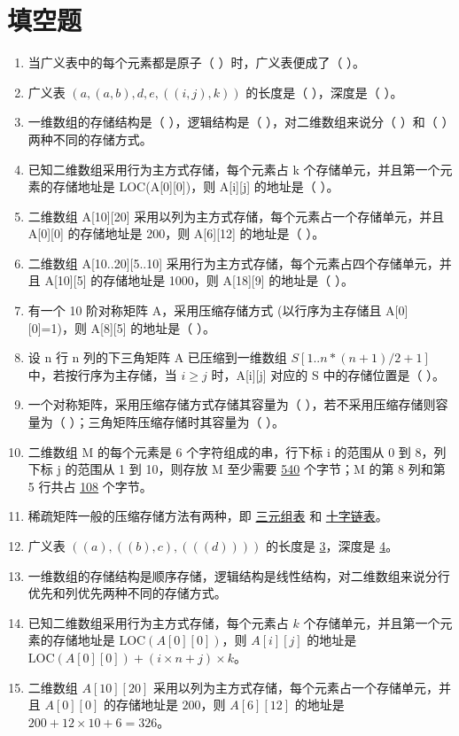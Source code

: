 \documentclass[12pt, a4paper]{article}
\begin{document}
\section*{填空题}

\begin{enumerate}
	\item 当广义表中的每个元素都是原子（ ）时，广义表便成了（ ）。
	\item 广义表 $(a, (a,b), d, e, ((i, j), k))$ 的长度是（ ），深度是（ ）。
	\item 一维数组的存储结构是（ ），逻辑结构是（ ），对二维数组来说分（ ）和（ ）两种不同的存储方式。
	\item 已知二维数组采用行为主方式存储，每个元素占 k 个存储单元，并且第一个元素的存储地址是 LOC(A[0][0])，则 A[i][j] 的地址是（ ）。
	\item 二维数组 A[10][20] 采用以列为主方式存储，每个元素占一个存储单元，并且 A[0][0] 的存储地址是 200，则 A[6][12] 的地址是（ ）。
	\item 二维数组 A[10..20][5..10] 采用行为主方式存储，每个元素占四个存储单元，并且 A[10][5] 的存储地址是 1000，则 A[18][9] 的地址是（ ）。
	\item 有一个 10 阶对称矩阵 A，采用压缩存储方式 (以行序为主存储且 A[0][0]=1)，则 A[8][5] 的地址是（ ）。
	\item 设 n 行 n 列的下三角矩阵 A 已压缩到一维数组 $S[1..n*(n+1)/2+1]$ 中，若按行序为主存储，当 $i \ge j$ 时，A[i][j] 对应的 S 中的存储位置是（ ）。
	\item 一个对称矩阵，采用压缩存储方式存储其容量为（ ），若不采用压缩存储则容量为（ ）；三角矩阵压缩存储时其容量为（ ）。
	\item 二维数组 M 的每个元素是 6 个字符组成的串，行下标 i 的范围从 0 到 8，列下标 j 的范围从 1 到 10，则存放 M 至少需要 \underline{540} 个字节；M 的第 8 列和第 5 行共占 \underline{108} 个字节。
	\item 稀疏矩阵一般的压缩存储方法有两种，即 \underline{三元组表} 和 \underline{十字链表}。
	\item 广义表 $((a), ((b), c), (((d))))$ 的长度是 \underline{3}，深度是 \underline{4}。
	\item 一维数组的存储结构是顺序存储，逻辑结构是线性结构，对二维数组来说分行优先和列优先两种不同的存储方式。
	\item 已知二维数组采用行为主方式存储，每个元素占 $k$ 个存储单元，并且第一个元素的存储地址是 $\text{LOC}(A[0][0])$，则 $A[i][j]$ 的地址是 $\text{LOC}(A[0][0]) + (i \times n + j) \times k$。

	\item 二维数组 $A[10][20]$ 采用以列为主方式存储，每个元素占一个存储单元，并且 $A[0][0]$ 的存储地址是 $200$，则 $A[6][12]$ 的地址是 $200 + 12 \times 10 + 6 = 326$。


\end{enumerate}
\end{document}
